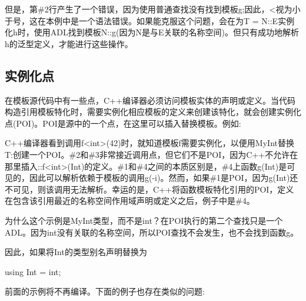 但是，第\#2行产生了一个错误，因为使用普通查找没有找到模板g;因此，<视为小于号，这在本例中是一个语法错误。如果能克服这个问题，会在为T = N::E实例化h时，使用ADL找到模板N::g(因为N是与E关联的名称空间)。但只有成功地解析h的泛型定义，才能进行这些操作。

\subsection{实例化点}

在模板源代码中有一些点，C++编译器必须访问模板实体的声明或定义。当代码构造引用模板特化时，需要实例化相应模板的定义来创建该特化，就会创建实例化点(POI)。POI是源中的一个点，在这里可以插入替换模板。例如:


C++编译器看到调用f<int>(42)时，就知道模板f需要实例化，以便用MyInt替换T:创建一个POI。\#2和\#3非常接近调用点，但它们不是POI，因为C++不允许在那里插入::f<int>(Int)的定义。\#1和\#4之间的本质区别是，\#4上函数g(Int)是可见的，因此可以解析依赖于模板的调用g(-i)。然而，如果\#1是POI，因为g(Int)还不可见，则该调用无法解析。幸运的是，C++将函数模板特化引用的POI，定义在包含该引用最近的名称空间作用域声明或定义之后，例子中是\#4。

为什么这个示例是MyInt类型，而不是int？在POI执行的第二个查找只是一个ADL。因为int没有关联的名称空间，所以POI查找不会发生，也不会找到函数g。

因此，如果将Int的类型别名声明替换为

\begin{cpp}
using Int = int;
\end{cpp}

前面的示例将不再编译。下面的例子也存在类似的问题:


